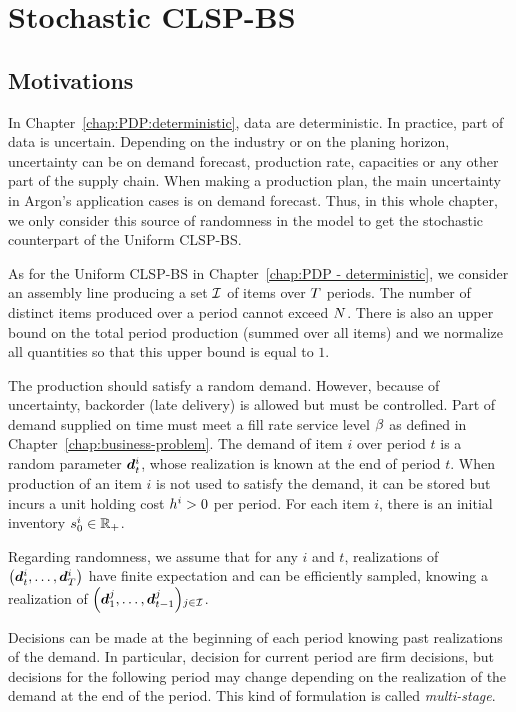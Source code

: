\chapter{Stochastic CLSP-BS}
\label{chap:PDP:stochastic}

\section{Motivations}


In Chapter~\ref{chap:PDP:deterministic}, data are deterministic. In practice, part of data is uncertain. Depending on the industry or on the planing horizon, uncertainty can be on demand forecast, production rate, capacities or any other part of the supply chain. When making a production plan, the main uncertainty in Argon's application cases is on demand forecast. Thus, in this whole chapter, we only consider this source of randomness in the model to get the stochastic counterpart of the Uniform CLSP-BS.


As for the Uniform CLSP-BS in Chapter~\ref{chap:PDP - deterministic}, we consider an assembly line producing a set $\mathcal{I}$ of items over $T$ periods. The number of distinct items produced over a period cannot exceed $N$. There is also an upper bound on the total period production (summed over all items) and we normalize all quantities so that this upper bound is equal to $1$.

The production should satisfy a random demand. However, because of uncertainty, backorder (\ie late delivery) is allowed but must be controlled. Part of demand supplied on time must meet a fill rate service level $\beta$ as defined in Chapter~\ref{chap:business-problem}. The demand of item $i$ over period $t$ is a random parameter $\va\demand_t^i$, whose realization is known at the end of period $t$. When production of an item $i$ is not used to satisfy the demand, it can be stored but incurs a unit holding cost $h^i>0$ per period. For each item $i$, there is an initial inventory $s_0^i\in\mathbb{R}_+$.

Regarding randomness, we assume that for any $i$ and $t$, realizations of $\bracket{\va\demand_t^i,\ldots,\va\demand_{\horizon}^i}$ have finite expectation and can be efficiently sampled, knowing a realization of $\bracket{\va\demand_1^j,\ldots,\va\demand_{t-1}^j}_{j\in\REF}$.

Decisions can be made at the beginning of each period knowing past realizations of the demand. In particular, decision for current period are firm decisions, but decisions for the following period may change depending on the realization of the demand at the end of the period. This kind of formulation is called \emph{multi-stage}.

